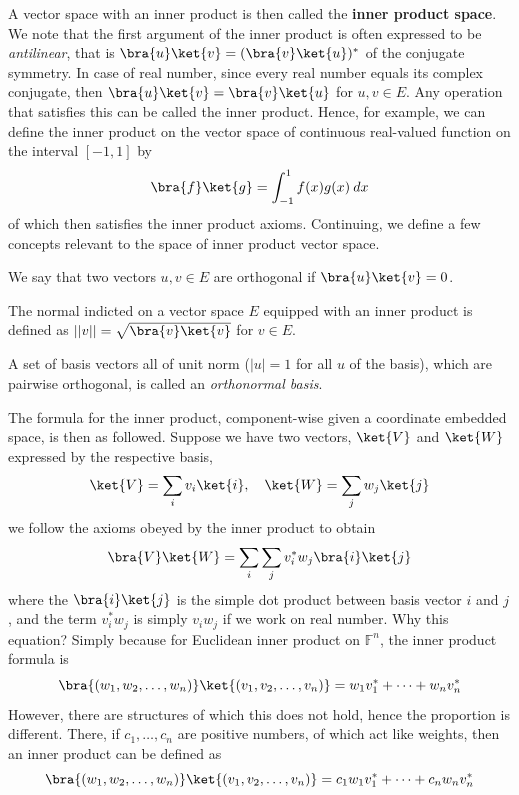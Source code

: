 A vector space with an inner product is then called the \textbf{inner product space}. We note that the first argument of the inner product is often expressed to be \textit{antilinear}, that is $\bra{u}\ket{v}=(\bra{v}\ket{u})^{*}$ of the conjugate symmetry. In case of real number, since every real number equals its complex conjugate, then $\bra{u}\ket{v}=\bra{v}\ket{u}$ for $u,v\in E$. Any operation that satisfies this can be called the inner product. Hence, for example, we can define the inner product on the vector space of continuous real-valued function on the interval $[-1,1]$ by 
\begin{equation}
    \bra{f}\ket{g} = \int^{1}_{-1} f(x)g(x)\: dx
\end{equation}
of which then satisfies the inner product axioms. Continuing, we define a few concepts relevant to the space of inner product vector space. 
\begin{definition}[Orthorgonality]
    We say that two vectors $u,v\in E$ are orthogonal if $\bra{u}\ket{v}=0$. 
\end{definition}
\begin{definition}[Norm]
    The normal indicted on a vector space $E$ equipped with an inner product is defined as $||v||=\sqrt{\bra{v}\ket{v}}$ for $v\in E$. 
\end{definition}
\begin{definition}
    A set of basis vectors all of unit norm ($|u|=1$ for all $u$ of the basis), which are pairwise orthogonal, is called an \textit{orthonormal basis}. 
\end{definition}

The formula for the inner product, component-wise given a coordinate embedded space, is then as followed. Suppose we have two vectors, $\ket{V}$ and $\ket{W}$ expressed by the respective basis, 
\begin{equation}
    \ket{V} = \sum_{i} v_{i}\ket{i},\quad \ket{W} = \sum_{j} w_{j}\ket{j}
\end{equation}
we follow the axioms obeyed by the inner product to obtain 
\begin{equation}
    \bra{V}\ket{W}=\sum_{i}\sum_{j} v_{i}^{*}w_{j}\bra{i}\ket{j}
\end{equation}
where the $\bra{i}\ket{j}$ is the simple dot product between basis vector $i$ and $j$, and the term $v_{i}^{*}w_{j}$ is simply $v_{i}w_{j}$ if we work on real number. Why this equation? Simply because for Euclidean inner product on $\mathbb{F}^{n}$, the inner product formula is 
\begin{equation}
    \bra{(w_{1},w_{2},\dots,w_{n})} \ket{(v_{1},v_{2},\dots,v_{n})} = w_{1}v_{1}^{*} + \dots + w_{n}v^{*}_{n}
\end{equation}
However, there are structures of which this does not hold, hence the proportion is different. There, if $c_{1},\dots,c_{n}$ are positive numbers, of which act like weights, then an inner product can be defined as 
\begin{equation}
    \bra{(w_{1},w_{2},\dots,w_{n})} \ket{(v_{1},v_{2},\dots,v_{n})} = c_{1}w_{1}v_{1}^{*} + \dots + c_{n} w_{n}v^{*}_{n}
\end{equation}
